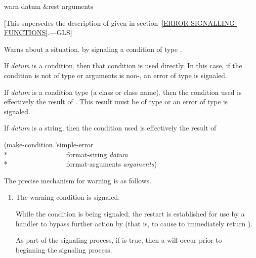 \begin{defun}[Function]
warn datum &rest arguments

   [This supersedes the description of 
   given in section~\ref{ERROR-SIGNALLING-FUNCTIONS}.---GLS]

  Warns about a situation, by signaling a condition of type .

  If {\it datum} is a condition, then that condition is used directly.
  In this case, if the condition is not of type  or arguments
  is non-, an error of type  is signaled.

  If {\it datum} is a condition type (a class or class name), then the condition used is effectively the result
  of . This result
  must be of type  or an error of type  is signaled.

  If {\it datum} is a string, then the condition used is effectively the result of
\begin{lisp}
(make-condition 'simple-error \\*
~~~~~~~~~~~~~~~~:format-string {\it datum} \\*
~~~~~~~~~~~~~~~~:format-arguments {\it arguments})
\end{lisp}

  The precise mechanism for warning is as follows.
\begin{enumerate}

%
\item The warning condition is signaled.

     While the  condition is being signaled, the 
     restart is established for use by a handler to bypass further action
     by  (that is, to cause  to immediately return ).

     As part of the signaling process, if
     is true, then a  will occur prior to beginning the signaling
     process.


\end{enumerate}
\end{defun}
